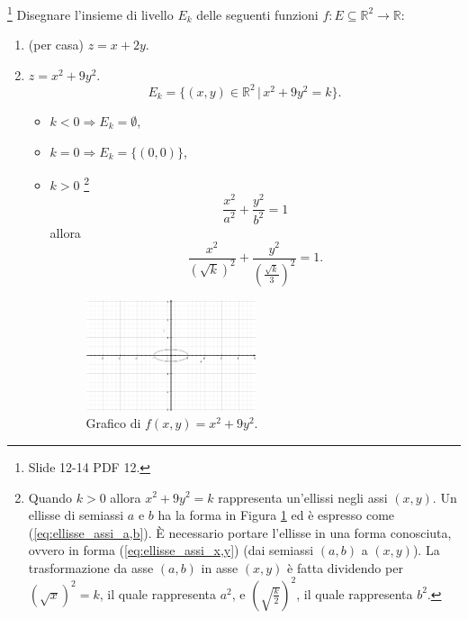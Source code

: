 \begin{example}\footnote{Slide 12-14 PDF 12.}
    Disegnare l'insieme di livello $E_k$ delle seguenti funzioni $f\colon E\subseteq\mathbb R^2\rightarrow\mathbb R$:
    \begin{enumerate}
        \item (per casa) $z=x+2y$.
        \item $z=x^2+9y^2$.
        \begin{equation*}
            E_k=\{(x,y)\in\mathbb R^2\,|\,x^2+9y^2=k\}.
        \end{equation*}
        \begin{itemize}
            \item $k<0\Longrightarrow E_k=\emptyset$,
            \item $k=0 \Longrightarrow E_k=\{(0,0)\}$,
            \item $k>0$ \footnote{Quando $k>0$ allora $x^2+9y^2=k$ rappresenta un'ellissi negli assi $(x,y)$. Un ellisse di semiassi $a$ e $b$ ha la forma in Figura \ref{fig:esempio_ellisse} ed è espresso come (\ref{eq:ellisse_assi_a,b}). È necessario portare l'ellisse in una forma conosciuta, ovvero in forma (\ref{eq:ellisse_assi_x,y}) (dai semiassi $(a,b)$ a $(x,y)$). La trasformazione da asse $(a,b)$ in asse $(x,y)$ è fatta  dividendo per $(\sqrt{x})^2=k$, il quale rappresenta $a^2$, e $\left(\sqrt{\frac{k}{2}}\right)^2$, il quale rappresenta $b^2$.} 
            \begin{equation}\label{eq:ellisse_assi_a,b}
                \frac{x^2}{a^2}+\frac{y^2}{b^2}=1
            \end{equation}
            allora
            \begin{equation}\label{eq:ellisse_assi_x,y}
                \frac{x^2}{\left(\sqrt{k}\right)^2}+\frac{y^2}{\left(\frac{\sqrt{k}}{3}\right)^2}=1.
            \end{equation}
            \begin{figure}
            \centering
            \includegraphics[width=0.5\textwidth]{Analisi2/figures/esempio_ellisse.jpg}
                \caption{Grafico di $f(x,y)=x^2+9y^2$.}\label{fig:esempio_ellisse}

\end{figure}
\end{itemize}
\end{enumerate}
\end{example}
